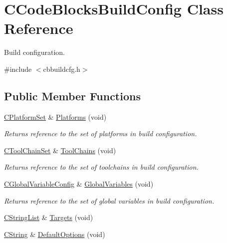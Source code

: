 \hypertarget{classCCodeBlocksBuildConfig}{\section{C\-Code\-Blocks\-Build\-Config Class Reference}
\label{classCCodeBlocksBuildConfig}
}


Build configuration.  




{\ttfamily \#include $<$cbbuildcfg.\-h$>$}

\subsection*{Public Member Functions}
\begin{DoxyCompactItemize}
\item 
\hyperlink{classCPlatformSet}{C\-Platform\-Set} \& \hyperlink{classCCodeBlocksBuildConfig_a6d56321c8f3b9e1305123eee8947a0c3}{Platforms} (void)
\begin{DoxyCompactList}\small\item\em Returns reference to the set of platforms in build configuration. \end{DoxyCompactList}\item 
\hyperlink{classCToolChainSet}{C\-Tool\-Chain\-Set} \& \hyperlink{classCCodeBlocksBuildConfig_a77b192d14a95e6f96468238ae06e1580}{Tool\-Chains} (void)
\begin{DoxyCompactList}\small\item\em Returns reference to the set of toolchains in build configuration. \end{DoxyCompactList}\item 
\hyperlink{classCGlobalVariableConfig}{C\-Global\-Variable\-Config} \& \hyperlink{classCCodeBlocksBuildConfig_a3d3fcc90f115088ebb9201ee1e4c204d}{Global\-Variables} (void)
\begin{DoxyCompactList}\small\item\em Returns reference to the set of global variables in build configuration. \end{DoxyCompactList}\item 
\hyperlink{classCStringList}{C\-String\-List} \& \hyperlink{classCCodeBlocksBuildConfig_a2ff25013bd1b3eab5cfc78dc6a95c9a9}{Targets} (void)
\item 
\hyperlink{classCString}{C\-String} \& \hyperlink{classCCodeBlocksBuildConfig_a68eab75304c81a43f01213824de37eaa}{Default\-Options} (void)
\item 

\end{DoxyCompactItemize}
